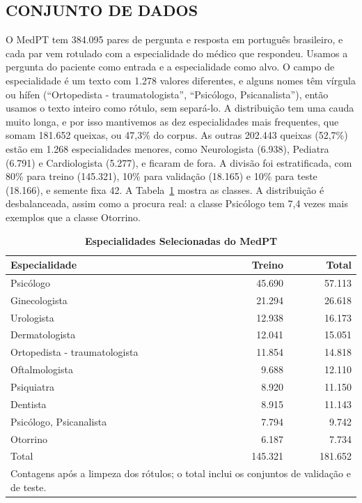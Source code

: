 \documentclass{ieeeaccess}
\begin{document}
\subsection{CONJUNTO DE DADOS}
O MedPT \cite{b8} tem 384.095 pares de pergunta e resposta em portugu\^es brasileiro, e cada par vem rotulado com a especialidade do m\'edico que respondeu. Usamos a pergunta do paciente como entrada e a especialidade como alvo. O campo de especialidade \'e um texto com 1.278 valores diferentes, e alguns nomes t\^em v\'irgula ou h\'ifen (``Ortopedista - traumatologista'', ``Psic\'ologo, Psicanalista''), ent\~ao usamos o texto inteiro como r\'otulo, sem separ\'a-lo. A distribui\c{c}\~ao tem uma cauda muito longa, e por isso mantivemos as dez especialidades mais frequentes, que somam 181.652 queixas, ou 47,3\% do corpus. As outras 202.443 queixas (52,7\%) est\~ao em 1.268 especialidades menores, como Neurologista (6.938), Pediatra (6.791) e Cardiologista (5.277), e ficaram de fora. A divis\~ao foi estratificada, com 80\% para treino (145.321), 10\% para valida\c{c}\~ao (18.165) e 10\% para teste (18.166), e semente fixa 42. A Tabela~\ref{tab:especialidades} mostra as classes. A distribui\c{c}\~ao \'e desbalanceada, assim como a procura real: a classe Psic\'ologo tem 7,4 vezes mais exemplos que a classe Otorrino.

\begin{table}[!t]
\caption{\textbf{Especialidades Selecionadas do MedPT}}
\label{tab:especialidades}
\setlength{\tabcolsep}{3pt}
\begin{tabular}{p{120pt}rr}
\hline
\textbf{Especialidade} & \textbf{Treino} & \textbf{Total} \\
\hline
Psic\'ologo & 45.690 & 57.113 \\
Ginecologista & 21.294 & 26.618 \\
Urologista & 12.938 & 16.173 \\
Dermatologista & 12.041 & 15.051 \\
Ortopedista - traumatologista & 11.854 & 14.818 \\
Oftalmologista & 9.688 & 12.110 \\
Psiquiatra & 8.920 & 11.150 \\
Dentista & 8.915 & 11.143 \\
Psic\'ologo, Psicanalista & 7.794 & 9.742 \\
Otorrino & 6.187 & 7.734 \\
\hline
Total & 145.321 & 181.652 \\
\hline
\multicolumn{3}{p{230pt}}{Contagens ap\'os a limpeza dos r\'otulos; o total inclui os conjuntos de valida\c{c}\~ao e de teste.}
\end{tabular}
\end{table}
\end{document}
